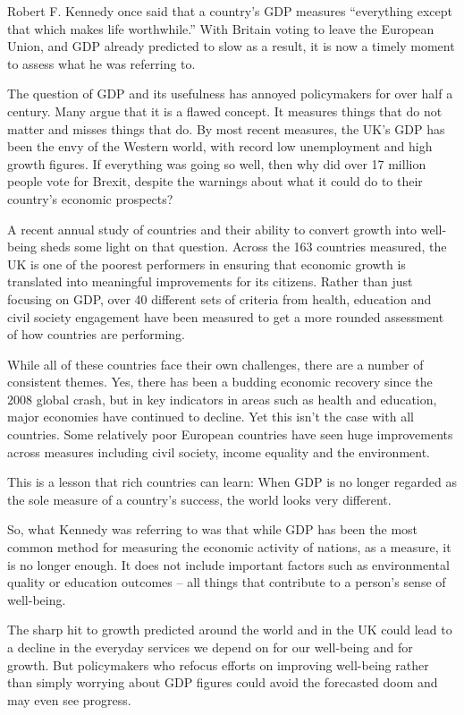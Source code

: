 Robert F. Kennedy once said that a country's GDP measures ``everything except that which makes life worthwhile.'' With Britain voting to leave the European Union, and GDP already predicted to slow as a result, it is now a timely moment to assess what he was referring to.


The question of GDP and its usefulness has annoyed policymakers for over half a century. Many argue that it is a flawed concept. It measures things that do not matter and misses things that do. By most recent measures, the UK's GDP has been the envy of the Western world, with record low unemployment and high growth figures. If everything was going so well, then why did over 17 million people vote for Brexit, despite the warnings about what it could do to their country's economic prospects?


A recent annual study of countries and their ability to convert growth into well-being sheds some light on that question. Across the 163 countries measured, the UK is one of the poorest performers in ensuring that economic growth is translated into meaningful improvements for its citizens. Rather than just focusing on GDP, over 40 different sets of criteria from health, education and civil society engagement have been measured to get a more rounded assessment of how countries are performing.


While all of these countries face their own challenges, there are a number of consistent themes. Yes, there has been a budding economic recovery since the 2008 global crash, but in key indicators in areas such as health and education, major economies have continued to decline. Yet this isn't the case with all countries. Some relatively poor European countries have seen huge improvements across measures including civil society, income equality and the environment.


This is a lesson that rich countries can learn: When GDP is no longer regarded as the sole measure of a country's success, the world looks very different.


So, what Kennedy was referring to was that while GDP has been the most common method for measuring the economic activity of nations, as a measure, it   is no longer enough. It does not include important factors such as environmental quality or education outcomes – all things that contribute to a person's sense of well-being.


The sharp hit to growth predicted around the world and in the UK could lead   to a decline in the everyday services we depend on for our well-being and for growth. But policymakers who refocus efforts on improving well-being rather than simply worrying about GDP figures could avoid the forecasted doom and may even see progress.